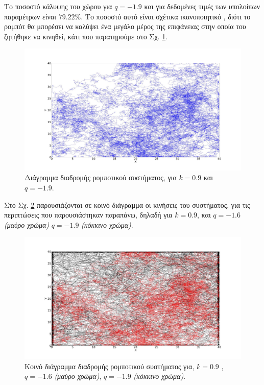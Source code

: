 Το ποσοστό κάλυψης του χώρου για $q = -1.9$ και για δεδομένες τιμές των υπολοίπων παραμέτρων είναι $79.22 \%$. Το ποσοστό αυτό είναι σχέτικα ικανοποιητικό , διότι το ρομπότ θα μπορέσει να καλύψει ένα μεγάλο μέρος της επιφάνειας στην οποία του ζητήθηκε να κινηθεί, κάτι που παρατηρούμε στο Σχ. \ref{f:g69}.


\begin{figure}[ht]
	\centering
	\includegraphics[width=1\linewidth]{LateX images/log/q/g1-1.9}
	\caption{Διάγραμμα διαδρομής ρομποτικού συστήματος, για $k = 0.9$ και $q = -1.9$.}
	\label{f:g69}	
\end{figure}





Στο Σχ. \ref{f:g71} παρουσιάζονται σε κοινό διάγραμμα οι κινήσεις του συστήματος, για τις
περιπτώσεις που παρουσιάστηκαν παραπάνω, δηλαδή για $k=0.9$, και $q = -1.6$ \emph{(μαύρο χρώμα)}
$q = -1.9$ \emph{(κόκκινο χρώμα)}.

\begin{figure}[ht]
	\centering
	\includegraphics[width=1\linewidth]{LateX images/log/q/g1}
	\caption{Κοινό διάγραμμα διαδρομής ρομποτικού συστήματος για, $k = 0.9$ , $q = -1.6$ \emph{(μαύρο χρώμα)}, $q = -1.9$ \emph{(κόκκινο χρώμα)}.}
	\label{f:g71}	
\end{figure}

